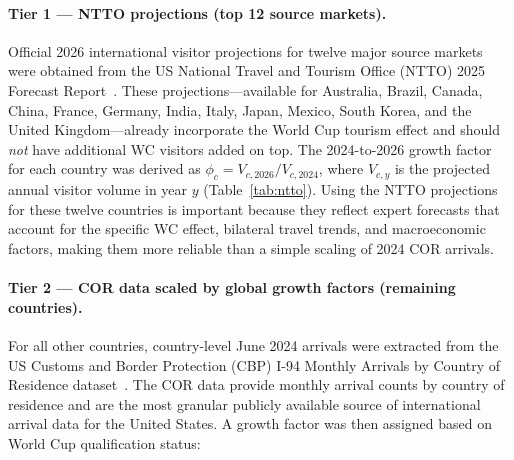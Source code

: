 \documentclass[12pt]{article}
\begin{document}
\paragraph{Tier 1 --- NTTO projections (top 12 source markets).}
Official 2026 international visitor projections for twelve major
source markets were obtained from the US National Travel and Tourism
Office (NTTO) 2025 Forecast Report~\cite{NTTO2025}.
These projections---available for Australia, Brazil, Canada, China,
France, Germany, India, Italy, Japan, Mexico, South Korea, and the
United Kingdom---already incorporate the World Cup tourism effect and
should \emph{not} have additional WC visitors added on top. The
2024-to-2026 growth factor for each country was derived as
$\phi_c = V_{c,2026} / V_{c,2024}$, where $V_{c,y}$ is the
projected annual visitor volume in year $y$ (Table~\ref{tab:ntto}).
Using the NTTO projections for these twelve countries is important
because they reflect expert forecasts that account for the specific
WC effect, bilateral travel trends, and macroeconomic factors, making
them more reliable than a simple scaling of 2024 COR arrivals.

\paragraph{Tier 2 --- COR data scaled by global growth factors
(remaining countries).}
For all other countries, country-level June 2024 arrivals were
extracted from the US Customs and Border Protection (CBP) I-94
Monthly Arrivals by Country of Residence dataset~\cite{CBP_I94}.
The COR data
provide monthly arrival counts by country of residence and are the
most granular publicly available source of international arrival
data for the United States. A growth factor was then assigned based
on World Cup qualification status:
\end{document}
